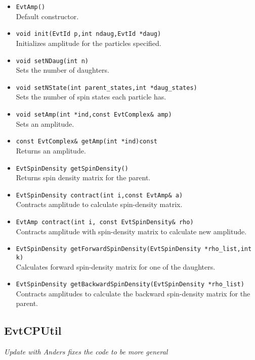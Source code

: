 \begin{itemize}
\item {\tt EvtAmp()}\\
      Default constructor.
\item {\tt void init(EvtId p,int ndaug,EvtId *daug)}\\
      Initializes amplitude for the particles specified.
\item {\tt void setNDaug(int n)}\\
      Sets the number of daughters.
\item {\tt void setNState(int parent\_states,int *daug\_states)}\\
      Sets the number of spin states each particle has. 
\item {\tt void setAmp(int *ind,const EvtComplex\& amp)}\\
      Sets an amplitude.
\item {\tt const EvtComplex\& getAmp(int *ind)const}\\
      Returns an amplitude.
\item {\tt EvtSpinDensity getSpinDensity()}\\ 
      Returns spin density matrix for the parent.
\item {\tt EvtSpinDensity contract(int i,const EvtAmp\& a)}\\
      Contracts  amplitude to calculate spin-density matrix.
\item {\tt EvtAmp contract(int i, const EvtSpinDensity\& rho)}\\
      Contracts amplitude with spin-density matrix to calculate new 
      amplitude.
\item {\tt EvtSpinDensity getForwardSpinDensity(EvtSpinDensity *rho\_list,int k)}\\
      Calculates forward spin-density matrix for one of the daughters.
\item {\tt EvtSpinDensity getBackwardSpinDensity(EvtSpinDensity *rho\_list)}\\
      Contracts amplitudes to calculate the backward spin-density matrix
      for the parent.
\end{itemize}

\subsection{EvtCPUtil}
{\it Update with Anders fixes the code to be more general}

